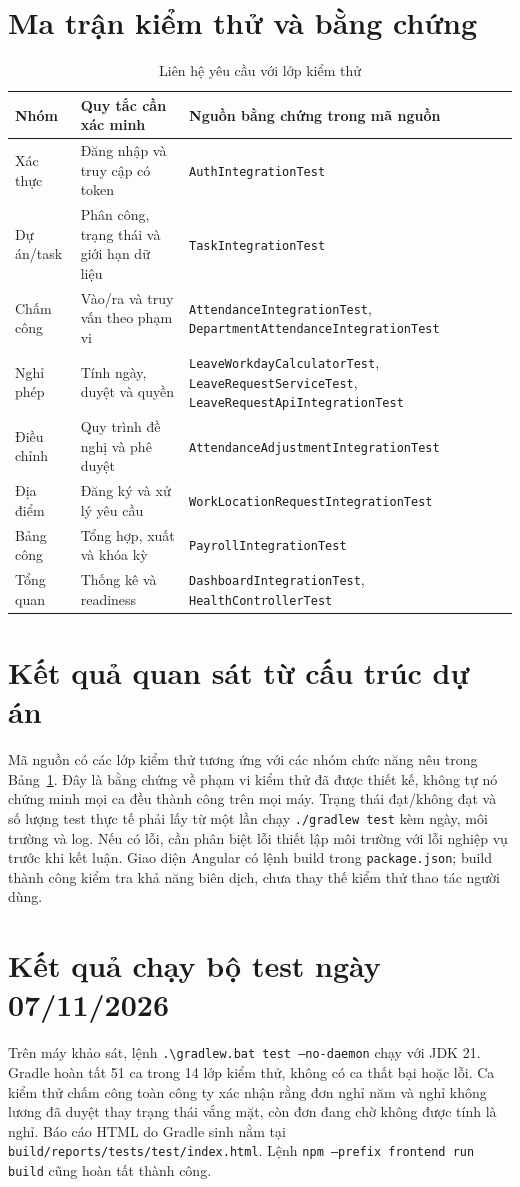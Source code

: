 \documentclass[12pt,a4paper,oneside]{report}
\newcommand{\code}[1]{\texttt{#1}}
\begin{document}
\section{Ma trận kiểm thử và bằng chứng}
\begin{longtable}{p{2cm}p{5.5cm}p{6cm}}\caption{Liên hệ yêu cầu với lớp kiểm thử}\label{tab:testmatrix}\\\toprule
\textbf{Nhóm}&\textbf{Quy tắc cần xác minh}&\textbf{Nguồn bằng chứng trong mã nguồn}\\\midrule
Xác thực&Đăng nhập và truy cập có token&\code{AuthIntegrationTest}\\
Dự án/task&Phân công, trạng thái và giới hạn dữ liệu&\code{TaskIntegrationTest}\\
Chấm công&Vào/ra và truy vấn theo phạm vi&\code{AttendanceIntegrationTest}, \code{DepartmentAttendanceIntegrationTest}\\
Nghỉ phép&Tính ngày, duyệt và quyền&\code{LeaveWorkdayCalculatorTest}, \code{LeaveRequestServiceTest}, \code{LeaveRequestApiIntegrationTest}\\
Điều chỉnh&Quy trình đề nghị và phê duyệt&\code{AttendanceAdjustmentIntegrationTest}\\
Địa điểm&Đăng ký và xử lý yêu cầu&\code{WorkLocationRequestIntegrationTest}\\
Bảng công&Tổng hợp, xuất và khóa kỳ&\code{PayrollIntegrationTest}\\
Tổng quan&Thống kê và readiness&\code{DashboardIntegrationTest}, \code{HealthControllerTest}\\\bottomrule
\end{longtable}

\section{Kết quả quan sát từ cấu trúc dự án}
Mã nguồn có các lớp kiểm thử tương ứng với các nhóm chức năng nêu trong Bảng~\ref{tab:testmatrix}. Đây là bằng chứng về phạm vi kiểm thử đã được thiết kế, không tự nó chứng minh mọi ca đều thành công trên mọi máy. Trạng thái đạt/không đạt và số lượng test thực tế phải lấy từ một lần chạy \code{./gradlew test} kèm ngày, môi trường và log. Nếu có lỗi, cần phân biệt lỗi thiết lập môi trường với lỗi nghiệp vụ trước khi kết luận. Giao diện Angular có lệnh build trong \code{package.json}; build thành công kiểm tra khả năng biên dịch, chưa thay thế kiểm thử thao tác người dùng.

\section{Kết quả chạy bộ test ngày 07/11/2026}
Trên máy khảo sát, lệnh \code{.\textbackslash gradlew.bat test --no-daemon} chạy với JDK 21. Gradle hoàn tất 51 ca trong 14 lớp kiểm thử, không có ca thất bại hoặc lỗi. Ca kiểm thử chấm công toàn công ty xác nhận rằng đơn nghỉ năm và nghỉ không lương đã duyệt thay trạng thái vắng mặt, còn đơn đang chờ không được tính là nghỉ. Báo cáo HTML do Gradle sinh nằm tại \code{build/reports/tests/test/index.html}. Lệnh \code{npm --prefix frontend run build} cũng hoàn tất thành công.
\end{document}
